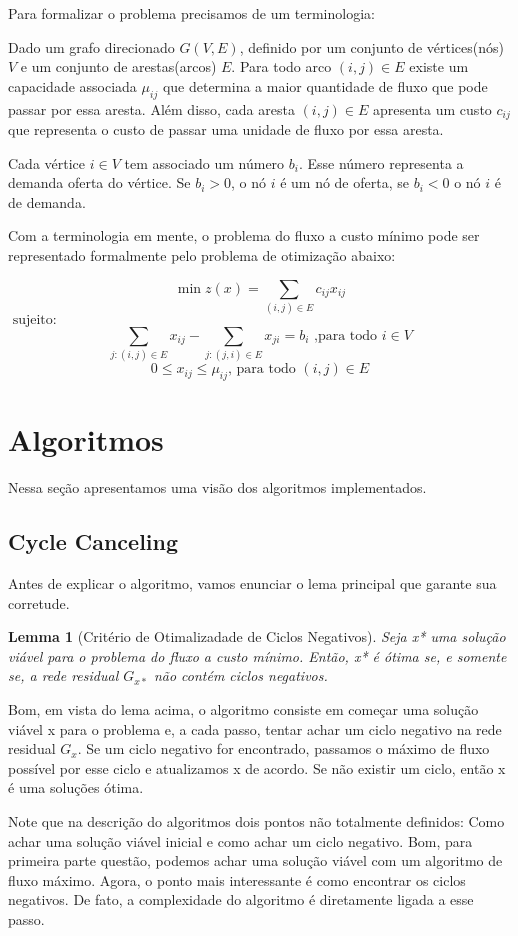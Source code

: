 \documentclass[12pt]{article}
\newtheorem{lem}[thm]{Lemma}
\begin{document}
Para formalizar o problema precisamos de um terminologia:

Dado um grafo direcionado $G(V, E)$, definido por um conjunto de vértices(nós) $V$ e um conjunto
de arestas(arcos) $E$. Para todo arco $(i, j) \in E$ existe um capacidade associada $\mu_{ij}$ que 
determina a maior quantidade de fluxo que pode passar por essa aresta. Além disso, cada aresta
$(i, j) \in E$ apresenta um custo $c_{ij}$ que representa o custo de passar uma unidade de fluxo por essa aresta.

Cada vértice $i \in V$ tem associado um número $b_i$. Esse número representa a demanda oferta do vértice. Se
$b_i > 0$, o nó $i$ é um nó de oferta, se $b_i < 0$ o nó $i$ é de demanda.

Com a terminologia em mente, o problema do fluxo a custo mínimo pode ser representado formalmente pelo problema 
de otimização abaixo:

$$
\min z(x) = \sum_{(i,j)\in E} c_{ij} x_{ij}
$$
$
\text{     sujeito:} 
$
$$
\sum_{j:(i,j)\in E} x_{ij} - \sum_{j:(j,i) \in E} x_{ji} = b_i \text{ ,para todo } i \in V 
$$
$$
0 \le x_{ij} \le \mu_{ij} \text{, para todo } (i, j) \in E
$$	


\section{Algoritmos}
Nessa seção apresentamos uma visão dos algoritmos implementados.

\subsection{Cycle Canceling}
Antes de explicar o algoritmo, vamos enunciar o lema principal que garante sua corretude. 

\begin{lem}[Critério de Otimalizadade de Ciclos Negativos]
	Seja x* uma solução viável para o problema do fluxo a custo mínimo. Então, 
	x* é ótima se, e somente se, a rede residual $G_{x*}$ não contém ciclos negativos.
\end{lem}

Bom, em vista do lema acima, o algoritmo consiste em começar uma solução viável x 
para o problema e, a cada passo, tentar achar um ciclo negativo na rede residual $G_x$.
Se um ciclo negativo for encontrado, passamos o máximo de fluxo possível por esse ciclo 
e atualizamos x de acordo. Se não existir um ciclo, então x é uma soluções ótima.

Note que na descrição do algoritmos dois pontos não totalmente definidos: Como achar 
uma solução viável inicial e como achar um ciclo negativo. Bom, para primeira parte 
questão, podemos achar uma solução viável com um algoritmo de fluxo máximo. Agora,
o ponto mais interessante é como encontrar os ciclos negativos. De fato, a complexidade
do algoritmo é diretamente ligada a esse passo. 
\end{document}
